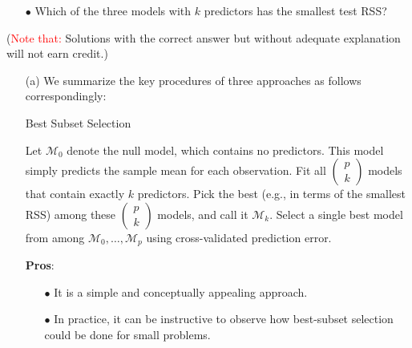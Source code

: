 \documentclass[10pt]{article}
\begin{document}
\begin{enumerate}[1.]
\begin{itemize}
\begin{itemize}
    			\item[$\bullet$] Which of the three models with $k$ predictors has the smallest test \textrm{RSS}? 
    		\end{itemize}
    	(\textcolor{red}{Note that:} Solutions with the correct answer but without adequate explanation will not earn credit.)
    	\end{itemize}
    	 \sol 
    	 \begin{itemize}
 			\item[(a)] We summarize the key procedures of three approaches as follows correspondingly:
 			\begin{algorithm}[t]
 				\caption{Best Subset Selection} 
 				\begin{algorithmic}[1]
		 			\State Let $\mathcal{M}_{0}$ denote the null model, which contains no predictors. This
model simply predicts the sample mean for each observation.
		 			\State  Fit all $\left( \begin{array}{c}
		 				p\\
		 				k
		 			\end{array}\right) $ models that contain exactly $k$ predictors.
		 			\State Pick the best (e.g., in terms of the smallest RSS) among these $\left( \begin{array}{c}
		 				p\\
		 				k
		 			\end{array}\right) $ models, and call it $\mathcal{M}_{k}$.
		 			\EndFor
		 			\State Select a single best model from among $\mathcal{M}_{0},\ldots,\mathcal{M}_{p}$ using cross-validated prediction error.
	 			\end{algorithmic} 
	 	\end{algorithm}
 	
	\textbf{Pros}: 
	\begin{itemize}
		\item[$\bullet$] It is a simple and conceptually appealing approach.
		
		\item[$\bullet$] In practice, it can be instructive to observe how best-subset selection could be done for small problems.
	\end{itemize}  
	

\end{itemize}
\end{enumerate}
\end{document}
